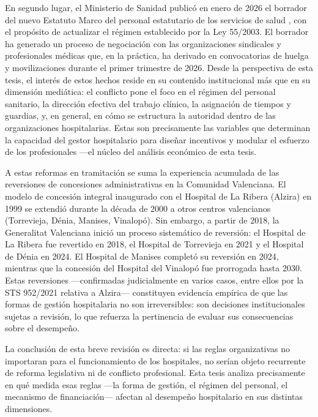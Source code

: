 En segundo lugar, el Ministerio de Sanidad publicó en enero de 2026 el borrador del nuevo Estatuto Marco del personal estatutario de los servicios de salud \citep{ministerio2026estatuto}, con el propósito de actualizar el régimen establecido por la Ley 55/2003. El borrador ha generado un proceso de negociación con las organizaciones sindicales y profesionales médicas que, en la práctica, ha derivado en convocatorias de huelga y movilizaciones durante el primer trimestre de 2026. Desde la perspectiva de esta tesis, el interés de estos hechos reside en su contenido institucional más que en su dimensión mediática: el conflicto pone el foco en el régimen del personal sanitario, la dirección efectiva del trabajo clínico, la asignación de tiempos y guardias, y, en general, en cómo se estructura la autoridad dentro de las organizaciones hospitalarias. Estas son precisamente las variables que determinan la capacidad del gestor hospitalario para diseñar incentivos y modular el esfuerzo de los profesionales ---el núcleo del análisis económico de esta tesis.

A estas reformas en tramitación se suma la experiencia acumulada de las reversiones de concesiones administrativas en la Comunidad Valenciana. El modelo de concesión integral inaugurado con el Hospital de La Ribera (Alzira) en 1999 se extendió durante la década de 2000 a otros centros valencianos (Torrevieja, Dénia, Manises, Vinalopó). Sin embargo, a partir de 2018, la Generalitat Valenciana inició un proceso sistemático de reversión: el Hospital de La Ribera fue revertido en 2018, el Hospital de Torrevieja en 2021 y el Hospital de Dénia en 2024. El Hospital de Manises completó su reversión en 2024, mientras que la concesión del Hospital del Vinalopó fue prorrogada hasta 2030. Estas reversiones ---confirmadas judicialmente en varios casos, entre ellos por la STS 952/2021 relativa a Alzira--- constituyen evidencia empírica de que las formas de gestión hospitalaria no son irreversibles: son decisiones institucionales sujetas a revisión, lo que refuerza la pertinencia de evaluar sus consecuencias sobre el desempeño.

La conclusión de esta breve revisión es directa: si las reglas organizativas no importaran para el funcionamiento de los hospitales, no serían objeto recurrente de reforma legislativa ni de conflicto profesional. Esta tesis analiza precisamente en qué medida esas reglas ---la forma de gestión, el régimen del personal, el mecanismo de financiación--- afectan al desempeño hospitalario en sus distintas dimensiones.



